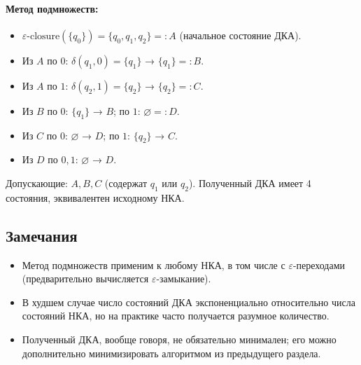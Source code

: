 \documentclass[12pt,a4paper]{article}
\theoremstyle{definition}
\begin{document}
\paragraph{Метод подмножеств:}
\begin{itemize}
\item $\varepsilon\text{-closure}(\{q_0\}) = \{q_0,q_1,q_2\} =: A$ (начальное состояние ДКА).
\item Из $A$ по $0$: $\delta(q_1,0)=\{q_1\}$ → $\{q_1\}=:B$.
\item Из $A$ по $1$: $\delta(q_2,1)=\{q_2\}$ → $\{q_2\}=:C$.
\item Из $B$ по $0$: $\{q_1\}$ → $B$; по $1$: $\varnothing=:D$.
\item Из $C$ по $0$: $\varnothing$ → $D$; по $1$: $\{q_2\}$ → $C$.
\item Из $D$ по $0,1$: $\varnothing$ → $D$.
\end{itemize}
Допускающие: $A,B,C$ (содержат $q_1$ или $q_2$). Полученный ДКА имеет 4 состояния, эквивалентен исходному НКА.

\begin{center}
\end{center}

\subsection{Замечания}
\begin{itemize}
\item Метод подмножеств применим к любому НКА, в том числе с $\varepsilon$-переходами (предварительно вычисляется $\varepsilon$-замыкание).
\item В худшем случае число состояний ДКА экспоненциально относительно числа состояний НКА, но на практике часто получается разумное количество.
\item Полученный ДКА, вообще говоря, не обязательно минимален; его можно дополнительно минимизировать алгоритмом из предыдущего раздела.
\end{itemize}
\end{document}
